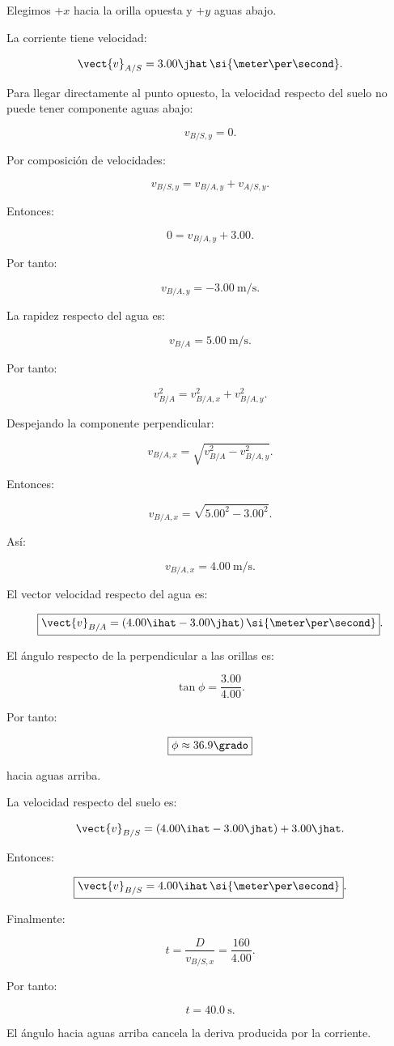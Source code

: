 \begin{explicacion}
Elegimos \(+x\) hacia la orilla opuesta
y \(+y\) aguas abajo.

La corriente tiene velocidad:

\[
\vect{v}_{A/S}
=
3.00\jhat\,
\si{\meter\per\second}.
\]

Para llegar directamente al punto opuesto,
la velocidad respecto del suelo no puede
tener componente aguas abajo:

\[
v_{B/S,y}=0.
\]

Por composición de velocidades:

\[
v_{B/S,y}
=
v_{B/A,y}+v_{A/S,y}.
\]

Entonces:

\[
0=v_{B/A,y}+3.00.
\]

Por tanto:

\[
\boxed{
v_{B/A,y}=-\SI{3.00}{\meter\per\second}
}.
\]

La rapidez respecto del agua es:

\[
v_{B/A}=\SI{5.00}{\meter\per\second}.
\]

Por tanto:

\[
v_{B/A}^2
=
v_{B/A,x}^2+v_{B/A,y}^2.
\]

Despejando la componente perpendicular:

\[
v_{B/A,x}
=
\sqrt{v_{B/A}^2-v_{B/A,y}^2}.
\]

Entonces:

\[
v_{B/A,x}
=
\sqrt{5.00^2-3.00^2}.
\]

Así:

\[
\boxed{
v_{B/A,x}=\SI{4.00}{\meter\per\second}
}.
\]

El vector velocidad respecto del agua es:

\[
\boxed{
\vect{v}_{B/A}
=
(4.00\ihat-3.00\jhat)\,
\si{\meter\per\second}
}.
\]

El ángulo respecto de la perpendicular
a las orillas es:

\[
\tan\phi=\frac{3.00}{4.00}.
\]

Por tanto:

\[
\boxed{
\phi\approx36.9\grado
}
\]

hacia aguas arriba.

La velocidad respecto del suelo es:

\[
\vect{v}_{B/S}
=
(4.00\ihat-3.00\jhat)
+
3.00\jhat.
\]

Entonces:

\[
\boxed{
\vect{v}_{B/S}
=
4.00\ihat\,
\si{\meter\per\second}
}.
\]

Finalmente:

\[
t=\frac{D}{v_{B/S,x}}
=
\frac{160}{4.00}.
\]

Por tanto:

\[
\boxed{
t=\SI{40.0}{\second}
}.
\]

El ángulo hacia aguas arriba cancela la
deriva producida por la corriente.
\end{explicacion}


